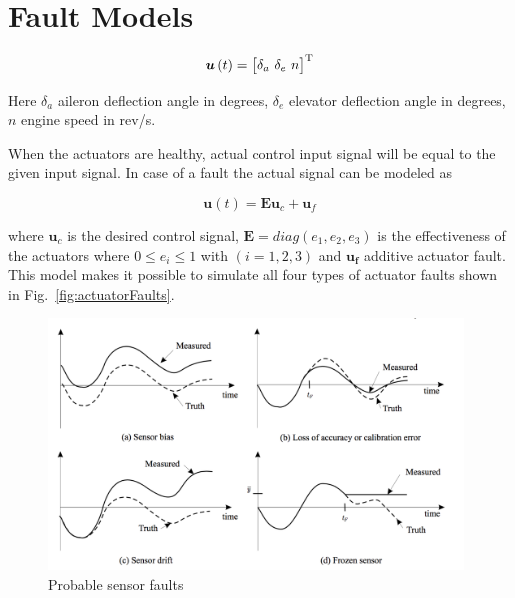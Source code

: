 \section{Fault Models}

\begin{equation}
\bm{u}\left(t\right)= \begin{bmatrix} {\delta}_{a}\ {\delta}_{e}\ n \end{bmatrix}^{\rm T}
\end{equation}

Here $ \delta_{a}$ aileron deflection angle in degrees, $ \delta_{e}$ elevator deflection angle in degrees, $n$ engine speed in rev/s. 


When the actuators are healthy, actual control input signal will be equal to the given input signal.
In case of a fault the actual signal can be modeled as

\begin{equation}
\bm{u}\left(t\right)= \bm{E}\bm{u}_c + \bm{u}_f
\end{equation}

where $\bm{u}_c $ is the desired control signal, $\bm{E} = diag(e_1, e_2, e_3)$ is the effectiveness of the actuators where $0 \leq e_i \leq 1 $ with $(i = 1, 2 ,3)$ and $\bm{u_f}$ additive actuator fault. This model makes it possible to simulate all four types of actuator faults shown in Fig.~\ref{fig:actuatorFaults}.


\begin{figure}
\begin{center}
\includegraphics[width=11cm]{figures/sensorFaults}    %
\caption{Probable sensor faults \cite{ducard2009fault}} 
\label{fig:sensorFaults}
\end{center}
\end{figure}


